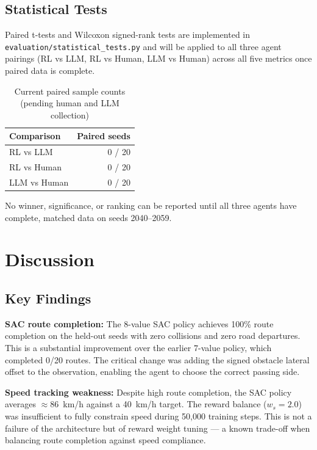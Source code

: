 \documentclass[12pt,a4paper]{report}
\begin{document}
\section{Statistical Tests}

Paired t-tests and Wilcoxon signed-rank tests are implemented in \texttt{evaluation/statistical\_tests.py} and will be applied to all three agent pairings (RL vs LLM, RL vs Human, LLM vs Human) across all five metrics once paired data is complete.

\begin{table}[H]
\centering
\caption{Current paired sample counts (pending human and LLM collection)}
\label{tab:pairs}
\begin{tabular}{lr}
\toprule
Comparison & Paired seeds \\
\midrule
RL vs LLM & 0 / 20 \\
RL vs Human & 0 / 20 \\
LLM vs Human & 0 / 20 \\
\bottomrule
\end{tabular}
\end{table}

No winner, significance, or ranking can be reported until all three agents have complete, matched data on seeds 2040--2059.

\chapter{Discussion}

\section{Key Findings}

\textbf{SAC route completion:} The 8-value SAC policy achieves 100\% route completion on the held-out seeds with zero collisions and zero road departures. This is a substantial improvement over the earlier 7-value policy, which completed 0/20 routes. The critical change was adding the signed obstacle lateral offset to the observation, enabling the agent to choose the correct passing side.

\textbf{Speed tracking weakness:} Despite high route completion, the SAC policy averages $\approx$86~km/h against a 40~km/h target. The reward balance ($w_s = 2.0$) was insufficient to fully constrain speed during 50,000 training steps. This is not a failure of the architecture but of reward weight tuning — a known trade-off when balancing route completion against speed compliance.
\end{document}
